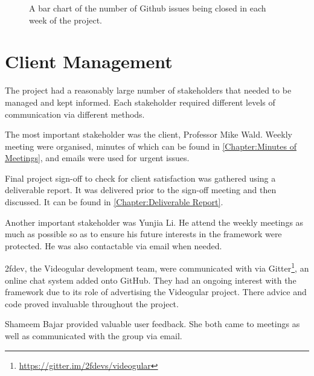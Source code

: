 \begin{figure}
\centering
{}
  \caption{A bar chart of the number of Github issues being closed in each week of the project.}
  \label{fig:tasksweek}
\end{figure}

\section{Client Management} 
\label{Section:Client Management}

The project had a reasonably large number of stakeholders that needed to be managed and kept informed. Each stakeholder required different levels of communication via different methods.

The most important stakeholder was the client, Professor Mike Wald. Weekly meeting were organised, minutes of which can be found in \autoref{Chapter:Minutes of Meetings}, and emails were used for urgent issues. 

Final project sign-off to check for client satisfaction was gathered using a deliverable report. It was delivered prior to the sign-off meeting and then discussed. It can be found in \autoref{Chapter:Deliverable Report}.

Another important stakeholder was Yunjia Li. He attend the weekly meetings as much as possible so as to ensure his future interests in the framework were protected. He was also contactable via email when needed.

2fdev, the Videogular development team, were communicated with via Gitter\footnote{\url{https://gitter.im/2fdevs/videogular}}, an online chat system added onto GitHub. They had an ongoing interest with the framework due to its role of advertising the Videogular project.  There advice and code proved invaluable throughout the project.

Shameem Bajar provided valuable user feedback. She both came to meetings as well as communicated with the group via email.
